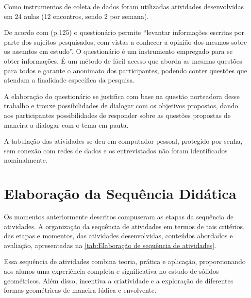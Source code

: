 Como instrumentos de coleta de dados foram utilizadas atividades desenvolvidas em 24 aulas (12 encontros, sendo 2 por semana).

De acordo com  (p.125) o questionário permite ``levantar
informações escritas por parte dos sujeitos pesquisados, com vistas a conhecer a opinião dos mesmos sobre os assuntos em estudo''. O questionário é um instrumento empregado para se obter informações. É um método de fácil acesso que aborda as mesmas questões para todos e garante o anonimato dos participantes, podendo conter questões que atendam a finalidade específica da pesquisa.

A elaboração do questionário se justifica com base na questão norteadora desse trabalho e trouxe possibilidades de dialogar com os objetivos propostos, dando aos participantes possibilidades de responder sobre as questões propostas de maneira a dialogar com o tema em pauta.

A tabulação das atividades se deu em computador pessoal, protegido por senha, sem conexão com redes de dados e os entrevistados não foram identificados nominalmente.

\section{Elaboração da Sequência Didática}

Os momentos anteriormente descritos compuseram as etapas da sequência de atividades. A organização da sequência de atividades em termos de tais critérios, das etapas e momentos, das atividades desenvolvidas, conteúdos abordados e avaliação, apresentadas na \autoref{tab:Elaboração de sequência de atividades}.

Essa sequência de atividades combina teoria, prática e aplicação, proporcionando aos alunos uma experiência completa e significativa no estudo de sólidos geométricos. Além disso, incentiva a criatividade e a exploração de diferentes formas geométricas de maneira lúdica e envolvente.

